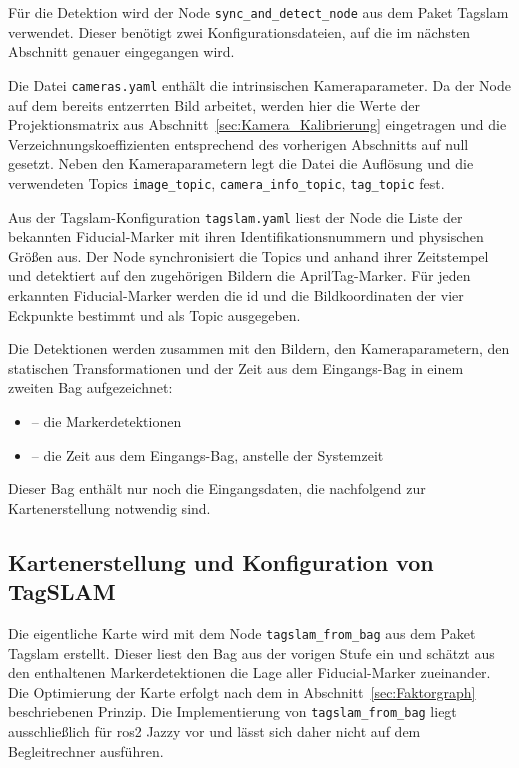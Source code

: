 Für die Detektion wird der Node \texttt{sync\_and\_detect\_node} aus dem Paket Tag\gls{slam} verwendet.
Dieser benötigt zwei Konfigurationsdateien, auf die im nächsten Abschnitt genauer eingegangen wird.

Die Datei \texttt{cameras.yaml} enthält die intrinsischen Kameraparameter.
Da der Node auf dem bereits entzerrten Bild  arbeitet, werden hier die Werte der Projektionsmatrix aus 
Abschnitt~\ref{sec:Kamera_Kalibrierung} eingetragen und die Verzeichnungskoeffizienten entsprechend des vorherigen Abschnitts auf null gesetzt.
Neben den Kameraparametern legt die Datei die Auflösung und die verwendeten Topics \texttt{image\_topic}, \texttt{camera\_info\_topic}, \texttt{tag\_topic} fest.

Aus der Tag\gls{slam}-Konfiguration \texttt{tagslam.yaml} liest der Node die Liste der bekannten Fiducial-Marker mit ihren 
Identifikationsnummern und physischen Größen aus.
Der Node synchronisiert die Topics  und  anhand ihrer Zeitstempel 
und detektiert auf den zugehörigen Bildern die AprilTag-Marker.
Für jeden erkannten Fiducial-Marker werden die \gls{id} und die Bildkoordinaten der vier Eckpunkte 
bestimmt und als Topic  ausgegeben.

Die Detektionen werden zusammen mit den Bildern, den Kameraparametern, den statischen Transformationen 
und der Zeit aus dem Eingangs-Bag in einem zweiten Bag aufgezeichnet:
\begin{itemize}
\item {} -- die Markerdetektionen
\item {} -- die Zeit aus dem Eingangs-Bag, anstelle der Systemzeit
\end{itemize}
Dieser Bag enthält nur noch die Eingangsdaten, die nachfolgend zur Kartenerstellung notwendig sind.





\subsection{Kartenerstellung und Konfiguration von TagSLAM}
\label{sec:kartierung_konfiguration_tagslam}
Die eigentliche Karte wird mit dem Node \texttt{tagslam\_from\_bag} aus dem Paket Tag\gls{slam} erstellt.
Dieser liest den Bag aus der vorigen Stufe ein und schätzt aus den enthaltenen Markerdetektionen die Lage aller Fiducial-Marker zueinander.
Die Optimierung der Karte erfolgt nach dem in Abschnitt~\ref{sec:Faktorgraph} beschriebenen Prinzip.
Die Implementierung von \texttt{tagslam\_from\_bag} liegt ausschließlich für \gls{ros2} Jazzy vor und lässt sich daher nicht auf dem Begleitrechner ausführen.

